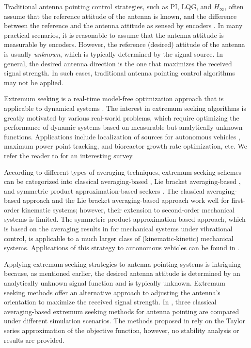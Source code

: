 \documentclass{ifacconf}
\begin{document}
Traditional antenna pointing control strategies, such as PI, LQG, and $H_\infty$, often assume that the reference attitude of the antenna is known, and the difference between the reference and the antenna attitude as sensed by encoders \citep{gawronski2001antenna,gawronski2007control}. In many practical scenarios, it is reasonable to assume that the antenna attitude is measurable by encoders. However, the reference (desired) attitude of the antenna is usually \textit{unknown}, which is typically determined by the signal source. In general, the desired antenna direction is the one that maximizes the received signal strength. In such cases, traditional antenna pointing control algorithms may not be applied.


Extremum seeking is a real-time model-free optimization approach that is applicable to dynamical systems \citep{krstic2000stability,ariyur2003real,scheinker2017model}. The interest in extremum seeking algorithms is greatly motivated by various real-world problems, which require optimizing the performance of dynamic systems based on measurable but analytically unknown functions. Applications include localization of sources for autonomous vehicles \citep{suttner2019extremum,wang2023underactuated}, maximum power point tracking, and bioreactor growth rate optimization, etc. We refer the reader to \cite{scheinker2024100} for an interesting survey.


According to different types of averaging techniques, extremum seeking schemes can be categorized into classical averaging-based \citep{krstic2000stability,ariyur2003real}, Lie bracket averaging-based \citep{durr2013lie,durr2017extremum}, and symmetric product approximation-based seekers \citep{suttner2022extremum,suttner2023extremum}. The classical averaging-based approach and the Lie bracket averaging-based approach work well for first-order kinematic systems; however, their extension to second-order mechanical systems is limited. The symmetric product approximation-based approach, which is based on the averaging results in \cite{bullo2002averaging} for mechanical systems under vibrational control, is applicable to a much larger class of (kinematic-kinetic) mechanical systems. Applications of this strategy
to autonomous vehicles can be found in \cite{suttner2019extremum,wang2023underactuated}.

Applying extremum seeking strategies to antenna pointing systems is intriguing because, as mentioned earlier, the desired antenna attitude is determined by an analytically unknown signal function and is typically unknown. Extremum seeking methods offer an alternative approach to adjusting the antenna’s orientation to maximize the received signal strength. In 
\cite{shore2024extremum}, three classical averaging-based extremum seeking methods for antenna pointing are compared under different simulation scenarios. The methods proposed in \cite{shore2024extremum} rely on the Taylor series approximation of the objective function, however, no stability analysis or results are provided. 
\end{document}
